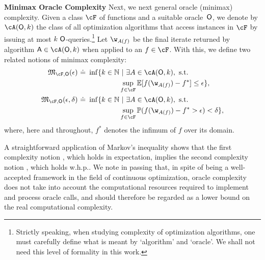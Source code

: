 \documentclass{article}
\theoremstyle{definition}  \newtheorem{exercise}{Exercise}
\theoremstyle{plain}
\newcommand{\pref}[1]{\prettyref{#1}}
\newcommand{\EE}{\mathbb{E}}
\newcommand{\PP}{\mathbb{P}}
\DeclarePairedDelimiter{\prn}{(}{)}
\newcommand{\defoo}{~\dot{=}~}
\newcommand{\NN}{\mathbb{N}}
\theoremstyle{definition}
\theoremstyle{remark}
\newcommand{\funclass}{\cF}
\newcommand{\algclassk}{\cA(\oracle,k)}
\newcommand{\alg}{\mathsf{A}}
\begin{document}
	\textbf{Minimax Oracle Complexity\quad} Next, we next  general oracle (minimax) complexity. Given a class $\funclass$
	of functions  and a suitable oracle~$\mathsf{O}$, we denote by 
	$\cA(\oracle,k)$ the class of all optimization algorithms that 
	access instances in $\funclass$ by issuing at most $k$ 
	$\mathsf{O}$-queries.\footnote{Strictly speaking, when studying 
	complexity 
	of optimization algorithms, one must carefully define what is meant by 
	`algorithm' and `oracle'. We shall not need this level of 
	formality in this work.}
Let $\w_{A(f)}$ be the final iterate 
	returned by algorithm $\alg\in\cA(\oracle,k)$ when applied to an $f\in\cF$. With this, we define two related 
	notions of minimax complexity:
	\newcommand{\comp}{\mathfrak{M}}
\begin{align}\label{eq:comp_exp}
		\comp_{\funclass,\oracle}(\epsilon) \defoo \inf\{  
		k\in\NN & \,\, |~ 
		\exists A\in\algclassk,\text{ s.t. } \nonumber\\
		& \sup_{f\in\funclass}\EE[ 
		f(\w_{A(f)}) - f^* ] \le \epsilon \},\\
	\label{eq:comp_whp}
		\comp_{\funclass,\oracle}(\epsilon,\delta) \defoo \inf \{ 
		k\in\NN& \,\,|~ \exists A\in\cA(\oracle,k),\text{ s.t.
		} \nonumber\\
		& \sup_{f\in\funclass} \PP\prn{f(\w_{A(f)}) - 
		f^*  > \epsilon} < \delta \}, 
\end{align}
where, here and throughout, $f^*$ denotes the infimum of 
	$f$ over its domain. 


	A straightforward application of Markov's inequality shows that the first 
	complexity notion \pref{eq:comp_exp}, which holds in expectation, implies 
	the second complexity notion \pref{eq:comp_whp}, which holds w.h.p.. We 
	note in passing that, in spite of being a well-accepted framework in 
	the field of continuous optimization, oracle complexity does not take into 
	account the computational resources required to implement and process 
	oracle calls, and should therefore be regarded as a lower 
	bound on the real computational complexity.
\end{document}
